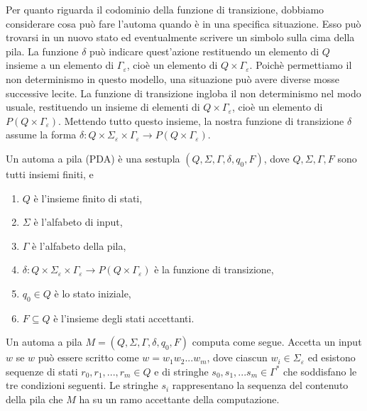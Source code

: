 \documentclass{article}
\begin{document}
Per quanto riguarda il codominio della funzione di transizione, dobbiamo considerare cosa può fare l'automa quando è in una specifica situazione. Esso può trovarsi in un nuovo stato ed eventualmente scrivere un simbolo sulla cima della pila. La funzione $\delta$ può indicare quest'azione restituendo un elemento di $Q$ insieme a un elemento di $\Gamma_\varepsilon$, cioè un elemento di $Q \times \Gamma_\varepsilon$. Poichè permettiamo il non determinismo in questo modello, una situazione può avere diverse mosse successive lecite. La funzione di transizione ingloba il non determinismo nel modo usuale, restituendo un insieme di elementi di $Q \times \Gamma_{\varepsilon}$, cioè un elemento di $P(Q \times \Gamma_{\varepsilon})$.
Mettendo tutto questo insieme, la nostra funzione di transizione $\delta$ assume la forma
$\delta : Q \times \Sigma_{\varepsilon} \times \Gamma_{\varepsilon} \rightarrow P(Q \times \Gamma_{\varepsilon})$.

\begin{tcolorbox}[colback=blue!10!white, colframe=blue!50!black, title=Automi a Pila]
Un automa a pila (PDA) è una sestupla $(Q, \Sigma, \Gamma, \delta, q_0, F)$, dove $Q, \Sigma, \Gamma, F$ sono tutti insiemi finiti, e
\begin{enumerate}
    \item $Q$ è l'insieme finito di stati,
    \item $\Sigma$ è l'alfabeto di input,
    \item $\Gamma$ è l'alfabeto della pila,
    \item $\delta: Q \times \Sigma_\varepsilon \times \Gamma_\varepsilon \rightarrow P(Q \times \Gamma_\varepsilon)$ è la funzione di transizione,
    \item $q_0 \in Q$ è lo stato iniziale,
    \item $F \subseteq Q$ è l'insieme degli stati accettanti.
\end{enumerate}
\end{tcolorbox}

Un automa a pila $M = (Q, \Sigma, \Gamma, \delta, q_0, F)$ computa come segue. Accetta un input $w$ se $w$ può essere scritto come $w = w_1w_2...w_m$, dove ciascun $w_i \in \Sigma_\varepsilon$
ed esistono sequenze di stati $r_0,r_1,...,r_m \in Q$ e di stringhe $s_0,s_1,...s_m \in \Gamma^*$ che soddisfano le tre condizioni seguenti. 
Le stringhe $s_i$ rappresentano la sequenza del contenuto della pila che $M$ ha su un ramo accettante della computazione.
\end{document}
